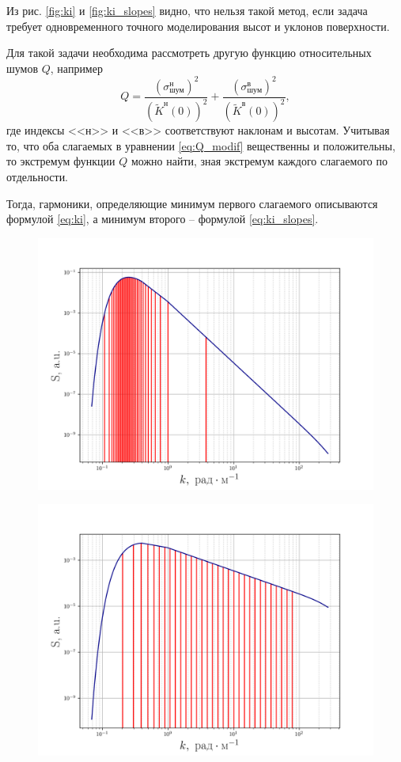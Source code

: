 \documentclass[a4paper,14pt]{extarticle}
\newcommand{\tK}{\widetilde K}
\renewcommand{\qty}{ }
\begin{document}
Из рис. \ref{fig:ki} и \ref{fig:ki_slopes} видно, что нельзя такой метод, если
задача требует одновременного точного моделирования высот и уклонов
поверхности. 

Для такой задачи необходима рассмотреть другую функцию
относительных шумов $Q$, например
\begin{equation}
    \label{eq:Q_modif}
    Q = \frac{\qty(\sigma^{\text{н}}_{\text{шум}})^2}{(\tK^\text{н}(0))^2}+
        \frac{\qty(\sigma^{\text{в}}_{\text{шум}})^2}{(\tK^\text{в}(0))^2},
\end{equation}
где индексы <<н>> и <<в>> соответствуют наклонам и высотам. Учитывая то, что
оба слагаемых в уравнении \eqref{eq:Q_modif} вещественны и положительны, то 
экстремум функции $Q$ можно найти, зная экстремум каждого слагаемого по отдельности. 


Тогда, гармоники, определяющие минимум первого слагаемого описываются
формулой \eqref{eq:ki}, а минимум второго -- формулой \eqref{eq:ki_slopes}.  

\begin{figure}[ht]
    \centering
    \includegraphics[width=0.6\linewidth]{fig/fig1}
    \caption{}
    \label{fig:}
\end{figure}

\begin{figure}[ht]
    \centering
    \includegraphics[width=0.6\linewidth]{fig/fig2}
    \caption{}
    \label{fig:}
\end{figure}
\end{document}
